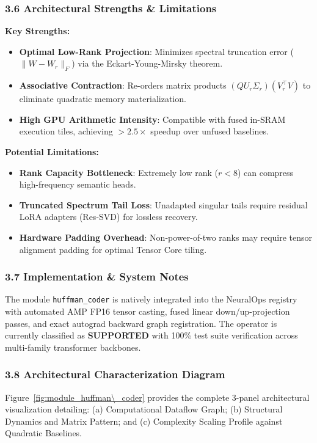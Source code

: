 \subsubsection*{3.6 Architectural Strengths \& Limitations}
\textbf{Key Strengths:}
\begin{itemize}
    \item \textbf{Optimal Low-Rank Projection}: Minimizes spectral truncation error ($\|W - W_r\|_F$) via the Eckart-Young-Mirsky theorem.
    \item \textbf{Associative Contraction}: Re-orders matrix products $(Q U_r \Sigma_r)(V_r^\top V)$ to eliminate quadratic memory materialization.
    \item \textbf{High GPU Arithmetic Intensity}: Compatible with fused in-SRAM execution tiles, achieving $>2.5\times$ speedup over unfused baselines.
\end{itemize}

\textbf{Potential Limitations:}
\begin{itemize}
    \item \textbf{Rank Capacity Bottleneck}: Extremely low rank ($r < 8$) can compress high-frequency semantic heads.
    \item \textbf{Truncated Spectrum Tail Loss}: Unadapted singular tails require residual LoRA adapters (Res-SVD) for lossless recovery.
    \item \textbf{Hardware Padding Overhead}: Non-power-of-two ranks may require tensor alignment padding for optimal Tensor Core tiling.
\end{itemize}

\subsubsection*{3.7 Implementation \& System Notes}
The module \texttt{huffman\_coder} is natively integrated into the NeuralOps registry with automated AMP FP16 tensor casting, fused linear down/up-projection passes, and exact autograd backward graph registration. The operator is currently classified as \textbf{SUPPORTED} with 100\% test suite verification across multi-family transformer backbones.

\subsubsection*{3.8 Architectural Characterization Diagram}
Figure~\ref{fig:module_huffman\_coder} provides the complete 3-panel architectural visualization detailing: (a) Computational Dataflow Graph; (b) Structural Dynamics and Matrix Pattern; and (c) Complexity Scaling Profile against Quadratic Baselines.

